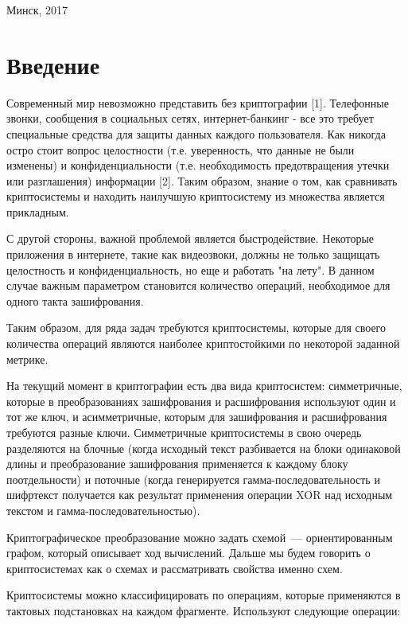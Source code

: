 \documentclass[a4paper,14pt]{extarticle}
\begin{document}
\begin{center}
{Минск, 2017}
\end{center}
\newpage
\tableofcontents
 
\clearpage

\newpage
\section*{Введение}
\vspace*{1cm}

Современный мир невозможно представить без криптографии [1]. Телефонные звонки, сообщения в социальных сетях, интернет-банкинг - все это требует специальные средства для защиты данных каждого пользователя. Как никогда остро стоит вопрос целостности (т.е. уверенность, что данные не были изменены) и конфиденциальности (т.е. необходимость предотвращения утечки или разглашения) информации [2]. Таким образом, знание о том, как сравнивать криптосистемы и находить наилучшую криптосистему из множества является прикладным.

С другой стороны, важной проблемой является быстродействие. Некоторые приложения в интернете, такие как видеозвоки, должны не только защищать целостность и конфиденциальность, но еще и работать "на лету". В данном случае важным параметром становится количество операций, необходимое для одного такта зашифрования.

Таким образом, для ряда задач требуются криптосистемы, которые для своего количества операций являются наиболее криптостойкими по некоторой заданной метрике.

На текущий момент в криптографии есть два вида криптосистем: симметричные, которые в преобразованиях зашифрования и расшифрования используют один и тот же ключ, и асимметричные, которым для зашифрования и расшифрования требуются разные ключи. Симметричные криптосистемы в свою очередь разделяются на блочные (когда исходный текст разбивается на блоки одинаковой длины и преобразование зашифрования применяется к каждому блоку поотдельности) и поточные (когда генерируется гамма-последовательность и шифртекст получается как результат применения операции XOR над исходным текстом и гамма-последовательностью). 

Криптографическое преобразование можно задать схемой~---
ориентированным графом, который описывает ход вычислений. Дальше мы будем говорить о криптосистемах как о схемах и рассматривать свойства именно схем.

Криптосистемы можно классифицировать по операциям, которые применяются в тактовых подстановках на каждом фрагменте. Используют следующие операции:
\end{document}

